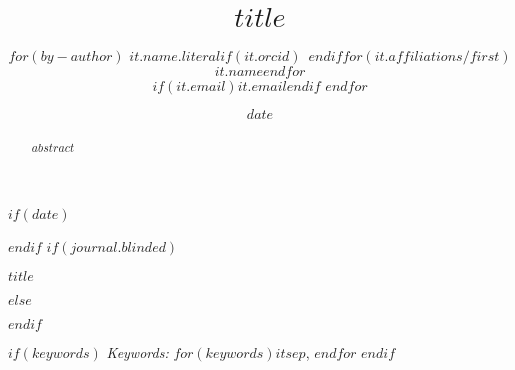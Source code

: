 

\def\spacingset#1{\renewcommand{\baselinestretch}%
{#1}\small\normalsize} \spacingset{1}



$if(date)$
\date{$date$}
$endif$
$if(journal.blinded)$
\spacingset{.8}
\bigskip
\bigskip
\bigskip
\begin{center}
  {\LARGE\bf $title$}
\end{center}
\smallskip
\bigskip
\spacingset{1}
$else$
\title{\bf $title$}
\author{
$for(by-author)$
$it.name.literal$$if(it.orcid)$~$endif$$for(it.affiliations/first)$\\$it.name$$endfor$\\$if(it.email)$\href{mailto:$it.email$}{$it.email$}$endif$
$endfor$}
\maketitle
$endif$

\bigskip
\bigskip
\begin{abstract}
$abstract$
\end{abstract}

$if(keywords)$
\noindent%
{\it Keywords:} $for(keywords)$$it$$sep$, $endfor$
\vfill
$endif$

\newpage
\spacingset{1.9} %
